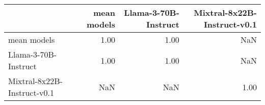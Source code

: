 \begin{tabular}{lrrr}
\toprule
 & mean models & Llama-3-70B-Instruct & Mixtral-8x22B-Instruct-v0.1 \\
\midrule
mean models & 1.00 & 1.00 & NaN \\
Llama-3-70B-Instruct & 1.00 & 1.00 & NaN \\
Mixtral-8x22B-Instruct-v0.1 & NaN & NaN & 1.00 \\
\bottomrule
\end{tabular}
